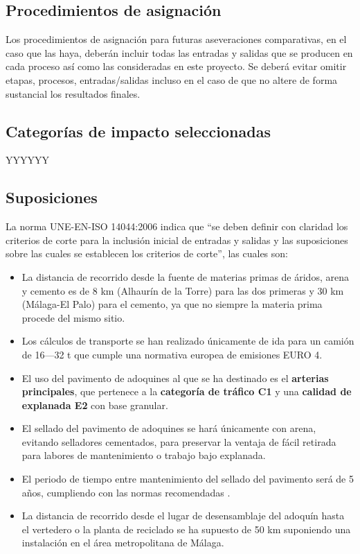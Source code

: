 \subsection{Procedimientos de asignación}
Los procedimientos de asignación para futuras aseveraciones comparativas, en el caso que las haya, deberán incluir todas las entradas y salidas que se producen en cada proceso así como las consideradas en este proyecto. Se deberá evitar omitir etapas, procesos, entradas/salidas incluso en el caso de que no altere de forma sustancial los resultados finales.

\subsection{Categorías de impacto seleccionadas}

YYYYYY

\subsection{Suposiciones}
La norma UNE-EN-ISO 14044:2006 \cite{iso14044} indica que ``se deben definir con claridad los criterios de corte para la inclusión inicial de entradas y salidas y las suposiciones sobre las cuales se establecen los criterios de corte'', las cuales son:

\begin{itemize}
  \item La distancia de recorrido desde la fuente de materias primas de áridos, arena y cemento es de 8 \si{km} (Alhaurín de la Torre) para las dos primeras y 30 \si{km} (Málaga-El Palo) para el cemento, ya que no siempre la materia prima procede del mismo sitio.
  \item Los cálculos de transporte se han realizado únicamente de ida para un camión de 16—32 \si{\tonne} que cumple una normativa europea de emisiones EURO 4.
  \item El uso del pavimento de adoquines al que se ha destinado es el \textbf{arterias principales}, que pertenece a la \textbf{categoría de tráfico C1} y una \textbf{calidad de explanada E2} con base granular.
  \item El sellado del pavimento de adoquines se hará únicamente con arena, evitando selladores cementados, para preservar la ventaja de fácil retirada para labores de mantenimiento o trabajo bajo explanada.
  \item El periodo de tiempo entre mantenimiento del sellado del pavimento será de 5 años, cumpliendo con las normas recomendadas \cite{euroadoquinc}.
  \item La distancia de recorrido desde el lugar de desensamblaje del adoquín hasta el vertedero o la planta de reciclado se ha supuesto de 50 \si{km} suponiendo una instalación en el área metropolitana de Málaga.

\end{itemize}

